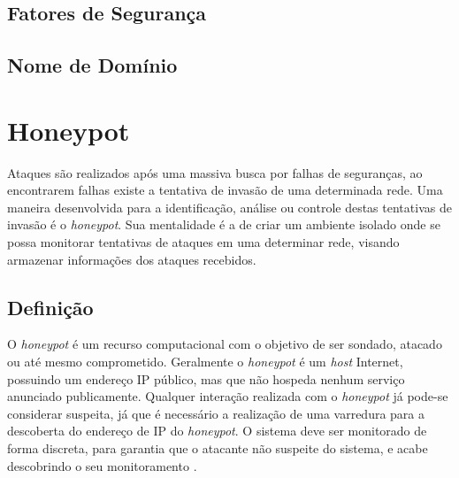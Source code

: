 
\subsection{Fatores de Segurança}


\subsection{Nome de Domínio}


\section{Honeypot}
\label{sec:introHoney}


Ataques são realizados após uma massiva busca por falhas de seguranças, ao encontrarem falhas existe a tentativa de invasão de uma determinada rede.
Uma maneira desenvolvida para a identificação, análise ou controle destas tentativas de invasão é o \textit{honeypot}. Sua mentalidade é a de criar um ambiente isolado onde se possa monitorar tentativas de ataques em uma determinar rede, visando armazenar informações dos ataques recebidos.

   
    
\subsection{Definição}
\label{sec:defiHoney}


O \textit{honeypot} é um recurso computacional com o objetivo de ser sondado, atacado ou até mesmo comprometido. Geralmente o \textit{honeypot} é um \textit{host} Internet, possuindo um endereço IP público, mas que não hospeda nenhum serviço anunciado publicamente. Qualquer interação realizada com o \textit{honeypot} já pode-se considerar suspeita, já que é necessário a realização de uma varredura para a descoberta do endereço de IP do \textit{honeypot}. O sistema deve ser monitorado de forma discreta, para garantia que o atacante não suspeite do sistema, e acabe descobrindo o seu monitoramento \cite{honey:2007}. %

